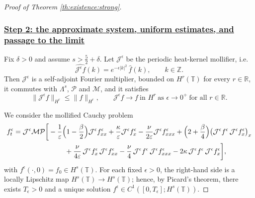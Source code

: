 \documentclass[reqno]{amsart}
\newcommand{\TT}{\mathbb T}
\theoremstyle{definition}
\numberwithin{equation}{section}
\numberwithin{theorem}{section}
\numberwithin{definition}{section}
\begin{document}
\begin{proof}[Proof of Theorem \ref{th:existence:strong}]
\subsubsection*{\underline{Step 2: the approximate system, uniform estimates, and passage to the limit}}

Fix $\delta>0$ and assume $s>\frac52+\delta$. Let $\mathcal{J}^\epsilon$ be the periodic heat-kernel mollifier, i.e.
\[
\widehat{\mathcal{J}^\epsilon f}(k)=e^{-\epsilon |k|^2}\,\widehat{f}(k),\qquad k\in\mathbb{Z}.
\]
Then $\mathcal{J}^\epsilon$ is a self-adjoint Fourier multiplier, bounded on $H^r(\TT)$ for every $r\in\mathbb{R}$, it commutes
with $\Lambda^s$, $\mathcal{P}$ and $\mathcal{M}$, and it satisfies
\begin{equation}\label{eq:J-properties}
	\|\mathcal{J}^\epsilon f\|_{H^r}\le \|f\|_{H^r},
	\qquad
	\mathcal{J}^\epsilon f\to f \ \text{in }H^r \ \text{as }\epsilon\to 0^+ \ \text{for all }r\in\mathbb{R}.
\end{equation}

We consider the mollified Cauchy problem
\begin{align}\label{eq:mollified-system-step2}
	f^\epsilon_t
	&=\mathcal{J}^{\epsilon}\mathcal{M}\mathcal{P}\bigg[
	- \frac{1}{\varepsilon}\Big(1-\frac{\beta}{2}\Big)\mathcal{J}^{\epsilon} f^{\epsilon}_{xx}
	+ \frac{\kappa}{\varepsilon}\mathcal{J}^{\epsilon} f^{\epsilon}_{x}
	- \frac{\nu}{2\varepsilon}\mathcal{J}^{\epsilon}f^{\epsilon}_{xxx}
	+ \Big(2+\frac{\beta}{4}\Big)\big(\mathcal{J}^{\epsilon}f^{\epsilon}\,\mathcal{J}^{\epsilon}f^{\epsilon}_{x}\big)_{x}
	\nonumber\\
	&\hspace{2.6cm}
	+ \frac{\nu}{4\varepsilon}\,\mathcal{J}^{\epsilon}f^{\epsilon}_{x}\,\mathcal{J}^{\epsilon}f^{\epsilon}_{xx}
	- \frac{\nu}{4}\,\mathcal{J}^{\epsilon}f^{\epsilon}\,\mathcal{J}^{\epsilon}f^{\epsilon}_{xxx}
	-2\kappa\,\mathcal{J}^{\epsilon} f^{\epsilon}\,\mathcal{J}^{\epsilon} f^{\epsilon}_{x}
	\bigg],
\end{align}
with $f^\epsilon(\cdot,0)=f_0\in H^s(\TT)$.
For each fixed $\epsilon>0$, the right-hand side is a locally Lipschitz map $H^s(\TT)\to H^s(\TT)$; hence, by Picard's theorem,
there exists $T_\epsilon>0$ and a unique solution $f^\epsilon\in C^1([0,T_\epsilon];H^s(\TT))$. \medskip


\end{proof}
\end{document}
